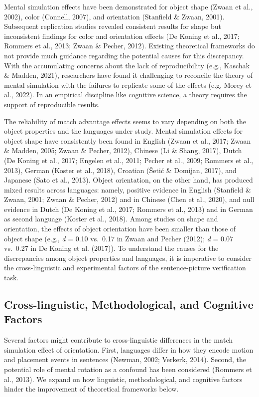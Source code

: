 \documentclass[
  man,floatsintext]{apa7}
\begin{document}
Mental simulation effects have been demonstrated for object shape
(Zwaan et al., 2002), color
(Connell, 2007), and orientation
(Stanfield \& Zwaan, 2001). Subsequent replication studies revealed
consistent results for shape but inconsistent findings for color and
orientation effects (De Koning et al., 2017; Rommers et al., 2013; Zwaan \& Pecher, 2012). Existing theoretical frameworks
do not provide much guidance regarding the potential causes for this
discrepancy. With the accumulating concerns about the lack of
reproducibility (e.g., Kaschak \& Madden, 2021), researchers
have found it challenging to reconcile the theory of mental simulation
with the failures to replicate some of the effects (e.g, Morey et al., 2022). In
an empirical discipline like cognitive science, a theory requires the
support of reproducible results.

The reliability of match advantage effects seems to vary depending on
both the object properties and the languages under study. Mental
simulation effects for object shape have consistently been found in
English (Zwaan et al., 2017; Zwaan \& Madden, 2005; Zwaan \& Pecher, 2012), Chinese (Li \& Shang, 2017),
Dutch (De Koning et al., 2017; Engelen et al., 2011; Pecher et al., 2009; Rommers et al., 2013), German
(Koster et al., 2018), Croatian
(Šetić \& Domijan, 2017), and Japanese
(Sato et al., 2013). Object orientation, on the other hand, has
produced mixed results across languages: namely, positive evidence in
English (Stanfield \& Zwaan, 2001; Zwaan \& Pecher, 2012)
and in Chinese (Chen et al., 2020), and null evidence in Dutch
(De Koning et al., 2017; Rommers et al., 2013) and in German
as second language (Koster et al., 2018). Among studies on
shape and orientation, the effects of object orientation have been
smaller than those of object shape (e.g., \emph{d} = 0.10 vs.~0.17 in
Zwaan and Pecher (2012); \emph{d} = 0.07 vs.~0.27 in
De Koning et al. (2017)). To understand the causes for the discrepancies
among object properties and languages, it is imperative to consider the
cross-linguistic and experimental factors of the sentence-picture
verification task.

\hypertarget{cross-linguistic-methodological-and-cognitive-factors}{%
\subsection{Cross-linguistic, Methodological, and Cognitive Factors}\label{cross-linguistic-methodological-and-cognitive-factors}}

Several factors might contribute to cross-linguistic differences in the
match simulation effect of orientation. First, languages differ in how
they encode motion and placement events in sentences
(Newman, 2002; Verkerk, 2014). Second, the
potential role of mental rotation as a confound has been considered
(Rommers et al., 2013). We expand on how linguistic,
methodological, and cognitive factors hinder the improvement of
theoretical frameworks below.
\end{document}
